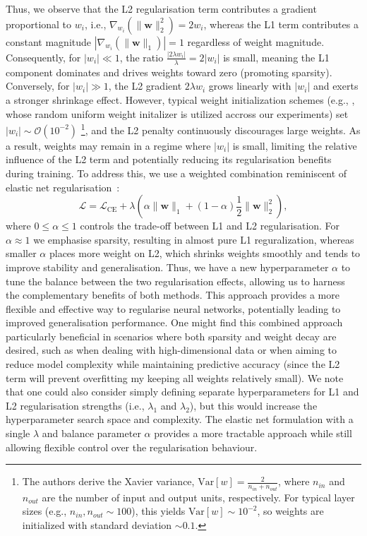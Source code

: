 {{Thus, we observe that the L2 regularisation term contributes a gradient proportional to $w_i$, i.e., $\nabla_{w_i}(\lVert \mathbf{w} \rVert_2^2) = 2w_i$, whereas the L1 term contributes a constant magnitude $|\nabla_{w_i}(\lVert \mathbf{w} \rVert_1)| = 1$ regardless of weight magnitude. Consequently, for $|w_i| \ll 1$, the ratio $\frac{|2\lambda w_i|}{\lambda} = 2|w_i|$ is small, meaning the L1 component dominates and drives weights toward zero (promoting sparsity). Conversely, for $|w_i| \gg 1$, the L2 gradient $2\lambda w_i$ grows linearly with $|w_i|$ and exerts a stronger shrinkage effect. However, typical weight initialization schemes (e.g., \cite{pmlr-v9-glorot10a_weight_init}, whose random uniform weight initalizer is utilized accross our experiments) set $|w_i| \sim \mathcal{O}(10^{-2})$ \footnote{
    The authors derive the Xavier variance, $\text{Var}[w] = \frac{2}{n_{in} + n_{out}}$, where $n_{in}$ and $n_{out}$ are the number of input and output units, respectively. For typical layer sizes (e.g., $n_{in}, n_{out} \sim 100$), this yields $\text{Var}[w] \sim 10^{-2}$, so weights are initialized with standard deviation $\sim 0.1$.
}, and the L2 penalty continuously discourages large weights. As a result, weights may remain in a regime where $|w_i|$ is small, limiting the relative influence of the L2 term and potentially reducing its regularisation benefits during training. To address this, we use a weighted combination reminiscent of elastic net regularisation~\cite{L1L2_combined}:
\begin{equation}\label{eq:elatic}
    \mathcal{L} = \mathcal{L}_{\text{CE}} + \lambda \left( \alpha \lVert \mathbf{w} \rVert_1 + (1 - \alpha) \frac{1}{2}\lVert \mathbf{w} \rVert_2^2 \right),
\end{equation}
where $0 \leq \alpha \leq 1$ controls the trade-off between L1 and L2 regularisation. For $\alpha \approx 1$ we emphasise sparsity, resulting in almost pure L1 reguralization, whereas smaller $\alpha$ places more weight on L2, which shrinks weights smoothly and tends to improve stability and generalisation. Thus, we have a new hyperparameter $\alpha$ to tune the balance between the two regularisation effects, allowing us to harness the complementary benefits of both methods. This approach provides a more flexible and effective way to regularise neural networks, potentially leading to improved generalisation performance. One might find this combined approach particularly beneficial in scenarios where both sparsity and weight decay are desired, such as when dealing with high-dimensional data or when aiming to reduce model complexity while maintaining predictive accuracy (since the L2 term will prevent overfitting my keeping all weights relatively small). We note that one could also consider simply defining separate hyperparameters for L1 and L2 regularisation strengths (i.e., $\lambda_1$ and $\lambda_2$), but this would increase the hyperparameter search space and complexity. The elastic net formulation with a single $\lambda$ and balance parameter $\alpha$ provides a more tractable approach while still allowing flexible control over the regularisation behaviour.}
}


